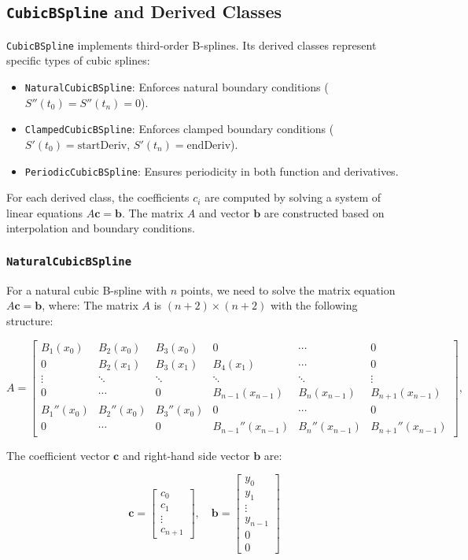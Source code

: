 \documentclass{article}
\begin{document}
\subsection{\texttt{CubicBSpline} and Derived Classes}
\texttt{CubicBSpline} implements third-order B-splines. Its derived classes represent specific types of cubic splines:
\begin{itemize}
    \item \texttt{NaturalCubicBSpline}: Enforces natural boundary conditions ($S''(t_0) = S''(t_n) = 0$).
    \item \texttt{ClampedCubicBSpline}: Enforces clamped boundary conditions ($S'(t_0) = \text{startDeriv}$, $S'(t_n) = \text{endDeriv}$).
    \item \texttt{PeriodicCubicBSpline}: Ensures periodicity in both function and derivatives.
\end{itemize}

For each derived class, the coefficients $c_i$ are computed by solving a system of linear equations $A \mathbf{c} = \mathbf{b}$. The matrix $A$ and vector $\mathbf{b}$ are constructed based on interpolation and boundary conditions.

\subsubsection{\texttt{NaturalCubicBSpline}}
For a natural cubic B-spline with \(n\) points, we need to solve the matrix equation \(A \mathbf{c} = \mathbf{b}\), where:
The matrix \(A\) is \((n+2) \times (n+2)\) with the following structure:

\[
A = \begin{bmatrix}
B_1(x_0) & B_2(x_0) & B_3(x_0) & 0 & \cdots & 0 \\
0 & B_2(x_1) & B_3(x_1) & B_4(x_1) & \cdots & 0 \\
\vdots & \ddots & \ddots & \ddots & \ddots & \vdots \\
0 & \cdots & 0 & B_{n-1}(x_{n-1}) & B_n(x_{n-1}) & B_{n+1}(x_{n-1}) \\
B_1''(x_0) & B_2''(x_0) & B_3''(x_0) & 0 & \cdots & 0 \\
0 & \cdots & 0 & B_{n-1}''(x_{n-1}) & B_n''(x_{n-1}) & B_{n+1}''(x_{n-1})
\end{bmatrix},
\]

The coefficient vector \(\mathbf{c}\) and right-hand side vector \(\mathbf{b}\) are:

\[
\mathbf{c} = \begin{bmatrix} c_0 \\ c_1 \\ \vdots \\ c_{n+1} \end{bmatrix}, \quad
\mathbf{b} = \begin{bmatrix} y_0 \\ y_1 \\ \vdots \\ y_{n-1} \\ 0 \\ 0 \end{bmatrix}
\]
\end{document}
